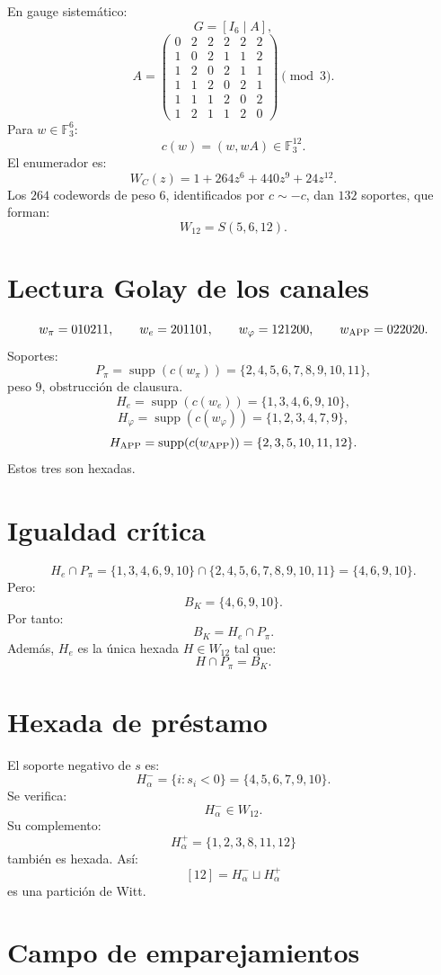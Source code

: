 \documentclass[11pt,a4paper]{article}
\newcommand{\F}{\mathbb F}
\newcommand{\supp}{\operatorname{supp}}
\begin{document}
En gauge sistemático:
\[
G=[I_6\mid A],
\]
\[
A=
\begin{pmatrix}
0&2&2&2&2&2\\
1&0&2&1&1&2\\
1&2&0&2&1&1\\
1&1&2&0&2&1\\
1&1&1&2&0&2\\
1&2&1&1&2&0
\end{pmatrix}
\pmod 3.
\]
Para \(w\in\F_3^6\):
\[
c(w)=(w,wA)\in\F_3^{12}.
\]
El enumerador es:
\[
W_C(z)=1+264z^6+440z^9+24z^{12}.
\]
Los \(264\) codewords de peso \(6\), identificados por \(c\sim-c\), dan \(132\) soportes, que forman:
\[
\boxed{W_{12}=S(5,6,12).}
\]

\section{Lectura Golay de los canales}

\[
w_\pi=010211,\qquad w_e=201101,\qquad w_\varphi=121200,\qquad w_{\rm APP}=022020.
\]
Soportes:
\[
P_\pi=\supp(c(w_\pi))=\{2,4,5,6,7,8,9,10,11\},
\]
peso \(9\), obstrucción de clausura.
\[
H_e=\supp(c(w_e))=\{1,3,4,6,9,10\},
\]
\[
H_\varphi=\supp(c(w_\varphi))=\{1,2,3,4,7,9\},
\]
\[
H_{\rm APP}=\supp(c(w_{\rm APP}))=\{2,3,5,10,11,12\}.
\]
Estos tres son hexadas.

\section{Igualdad crítica}

\[
H_e\cap P_\pi
=
\{1,3,4,6,9,10\}
\cap
\{2,4,5,6,7,8,9,10,11\}
=
\{4,6,9,10\}.
\]
Pero:
\[
B_K=\{4,6,9,10\}.
\]
Por tanto:
\[
\boxed{B_K=H_e\cap P_\pi.}
\]
Además, \(H_e\) es la única hexada \(H\in W_{12}\) tal que:
\[
H\cap P_\pi=B_K.
\]

\section{Hexada de préstamo}

El soporte negativo de \(s\) es:
\[
H_\alpha^-=\{i:s_i<0\}=\{4,5,6,7,9,10\}.
\]
Se verifica:
\[
H_\alpha^-\in W_{12}.
\]
Su complemento:
\[
H_\alpha^+=\{1,2,3,8,11,12\}
\]
también es hexada. Así:
\[
[12]=H_\alpha^-\sqcup H_\alpha^+
\]
es una partición de Witt.

\section{Campo de emparejamientos}
\end{document}

